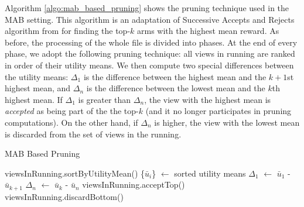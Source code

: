 Algorithm \ref{algo:mab_based_pruning} shows the pruning technique used in the
MAB setting.
This algorithm is an adaptation of Successive Accepts and Rejects
algorithm from \cite{BubeckWV13} for finding the top-$k$ arms with the highest
mean reward.
As before, the processing of the whole file is divided into phases.
At the end of every phase, we adopt the following pruning technique: all views
in running are ranked in order of their utility means. 
We then compute two special differences between the utility means: $\Delta_1$
is the difference between the highest mean and the $k+1$st highest mean, and
$\Delta_n$ is the difference between the lowest mean and the $k$th highest mean.
If $\Delta_1$ is greater than $\Delta_n$, the view with the highest mean is
{\it accepted} as being part of the the top-$k$ (and it no longer participates
in pruning computations).
On the other hand, if $\Delta_n$ is higher, the view with the lowest mean is discarded
from the set of views in the running.


\begin{algorithm}
\caption{MAB Based Pruning}
\label{algo:mab_based_pruning}
\begin{algorithmic}[1]
\State viewsInRunning.sortByUtilityMean()
\State \{$\bar{u}_{i}$\} $\gets$ sorted utility means
\State $\Delta_1$ $\gets$ $\bar{u}_{1}$ - $\bar{u}_{k+1}$
\State $\Delta_n$ $\gets$ $\bar{u}_{k}$ - $\bar{u}_{n}$
\State viewsInRunning.acceptTop()
\Else
\State viewsInRunning.discardBottom()
\EndIf
\end{algorithmic}
\end{algorithm}

